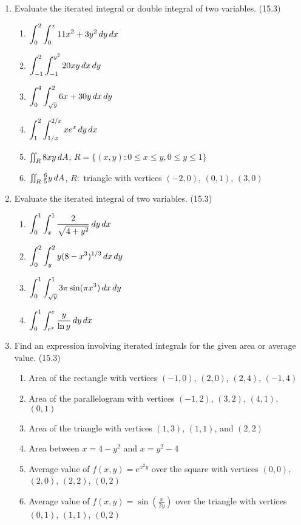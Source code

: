 \begin{enumerate}
    \item Evaluate the iterated integral or double integral of two variables. (15.3)

      \begin{enumerate}
        \item $\displaystyle\int_0^2\int_0^x 11x^2+3y^2\,d{y}\,d{x}$
        \item $\displaystyle\int_{-1}^2\int_{-1}^{y^2} 20xy\,d{x}\,d{y}$
        \item $\displaystyle\int_0^4\int_{\sqrt{y}}^2 6x+30y\,d{x}\,d{y}$
        \item $\displaystyle\int_{1}^{2}\int_{1/x}^{2/x} xe^x \,d{y}\,d{x}$
        \item $\iint_R 8xy\,d{A}$, $R = \{ (x,y) : 0\leq x\leq y,0\leq y\leq 1\}$
        \item $\iint_R \frac{6}{5}y\,d{A}$, $R:$ triangle with vertices $(-2,0)$, $(0,1)$, $(3,0)$
      \end{enumerate}

    \newpage

    \item Evaluate the iterated integral of two variables. (15.3)

      \begin{enumerate}
        \item $\displaystyle\int_0^1\int_x^1 \frac{2}{\sqrt{4+y^2}}\,d{y}\,d{x}$
        \item $\displaystyle\int_0^2\int_y^2 y(8-x^3)^{1/3}\,d{x}\,d{y}$
        \item $\displaystyle\int_0^1\int_{\sqrt{y}}^1 3\pi \sin(\pi x^3)\,d{x}\,d{y}$
        \item $\displaystyle\int_0^1\int_{e^x}^e \frac{y}{\ln y}\,d{y}\,d{x}$
      \end{enumerate}

    \item Find an expression involving iterated integrals for the given area or average value. (15.3)

      \begin{enumerate}
        \item Area of the rectangle with vertices $(-1,0)$, $(2,0)$, $(2,4)$, $(-1,4)$
        \item Area of the parallelogram with vertices $(-1,2)$, $(3,2)$, $(4,1)$, $(0,1)$
        \item Area of the triangle with vertices $(1,3)$, $(1,1)$, and $(2,2)$
        \item Area between $x=4-y^2$ and $x=y^2-4$
        \item Average value of $f(x,y)=e^{x^2y}$ over the square with vertices $(0,0)$, $(2,0)$, $(2,2)$, $(0,2)$
        \item Average value of $f(x,y)=\sin(\frac{x}{2y})$ over the triangle with vertices $(0,1)$, $(1,1)$, $(0,2)$
      \end{enumerate}


\end{enumerate}
